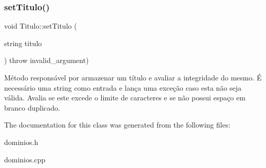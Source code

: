 \subsubsection{\texorpdfstring{set\+Titulo()}{setTitulo()}}
{\footnotesize\ttfamily void Titulo\+::set\+Titulo (\begin{DoxyParamCaption}\item[{string}]{titulo }\end{DoxyParamCaption}) throw  invalid\+\_\+argument) }

Método responsável por armazenar um título e avaliar a integridade do mesmo. É necessário uma string como entrada e lança uma exceção caso esta não seja válida. Avalia se este excede o limite de caracteres e se não possui espaço em branco duplicado. 

The documentation for this class was generated from the following files\+:\begin{DoxyCompactItemize}
\item 
dominios.\+h\item 
dominios.\+cpp\end{DoxyCompactItemize}
